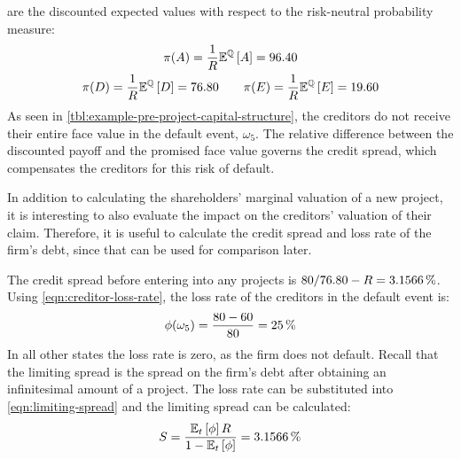 \documentclass[main.tex]{subfiles}
\begin{document}
    are the discounted expected values
    with respect to the risk-neutral probability measure:
        \begin{gather*}
            \pi(A) = \frac{1}{R} \mathbb{E}^{\mathbb{Q}}\left[A\right] = \num{96.40} \\
            \pi(D) = \frac{1}{R} \mathbb{E}^{\mathbb{Q}}\left[D\right] = \num{76.80}
            \qquad \pi(E) = \frac{1}{R} \mathbb{E}^{\mathbb{Q}}\left[E\right] = \num{19.60}
        \end{gather*}
    As seen in \cref{tbl:example-pre-project-capital-structure},
    the creditors do not receive their entire face value in the default event, $\omega_5$.
    The relative difference between the discounted payoff and the promised face value
    governs the credit spread, which compensates the creditors for this risk of default.

    In addition to calculating the shareholders' marginal valuation of a new project,
    it is interesting to also evaluate the impact on the creditors' valuation of their claim. 
    Therefore, it is useful to calculate the credit spread and loss rate of the firm's debt,
    since that can be used for comparison later.

    The credit spread before entering into any projects is 
    $\num{80}/\num{76.80} - \grossrfrate = \pct{0.031566}$.
    Using \cref{eqn:creditor-loss-rate}, the loss rate of the creditors in the default event is:
        \begin{equation*}
            \phi(\omega_{5}) 
            = 
                \frac{
                    \num{80}-\num{60}
                }{
                    \num{80}
                } 
            = 
                \pct{0.25}
        \end{equation*}
    In all other states the loss rate is zero, as the firm does not default.
    Recall that the limiting spread is the spread on the firm's debt 
    after obtaining an infinitesimal amount of a project. 
    The loss rate can be substituted into \cref{eqn:limiting-spread} 
    and the limiting spread can be calculated:
        \begin{equation*}
            S
            =
            \frac{
                \mathbb{E}_{t}\left[\phi\right]
                R
            }{
                1 
                -
                \mathbb{E}_{t}\left[\phi\right] 
            } 
            =
            \pct{0.031566}
        \end{equation*}
\end{document}
